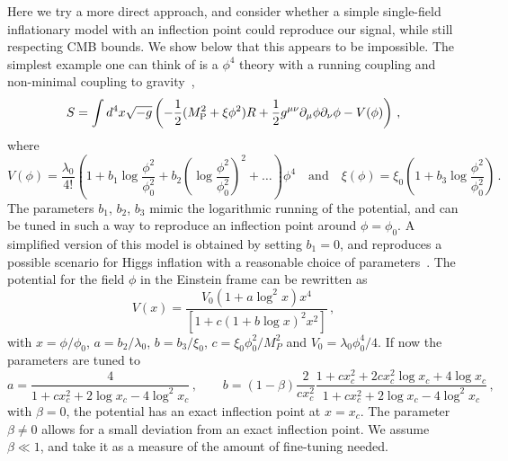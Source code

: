 \documentclass{article}
\begin{document}
Here we try a more direct approach, and consider whether a simple single-field inflationary model with an inflection point could reproduce our signal, while still respecting CMB bounds. We show below that this appears to be impossible.
The simplest example one can think of is a $\phi^4$ theory with a running coupling and non-minimal coupling to gravity~\cite{Ballesteros:2017fsr},
    \begin{equation}
        S = \int d^4 x \sqrt{-g} \left(-\frac{1}{2}(M_{\rm P}^2+\xi\phi^2)R + \frac{1}{2}g^{\mu\nu}\partial_\mu\phi \partial_\nu\phi - V(\phi) \right)\,,
    \end{equation}
    where
    \begin{equation}
        V(\phi) = \frac{\lambda_0}{4!} \left(1+b_1 \log\frac{\phi^2}{\phi_0^2}+b_2\left(\log\frac{\phi^2}{\phi_0^2}\right)^2+\ldots\right)\phi^4
        \quad
        \text{and}
        \quad
        \xi(\phi) = \xi_0 \left(1+b_3\log\frac{\phi^2}{\phi_0^2}\right) \,.
    \end{equation}
The parameters $b_1$, $b_2$, $b_3$ mimic the logarithmic running of the potential, and can be tuned in such a way to reproduce an inflection point around $\phi=\phi_0$. A simplified version of this model is obtained by setting $b_1 =0$, and reproduces a possible scenario for Higgs inflation with a reasonable choice of parameters~\cite{Garcia-Bellido:2017mdw, Drees:2019xpp}.
The potential for the field $\phi$ in the Einstein frame can be rewritten as
\begin{equation}
    V(x) = \frac{V_0 (1+a \log^2 x)x^4}{[1+c (1+b \log x)^2 x^2]}\,,
\end{equation}
with $ x= \phi/\phi_0$, $a = b_2/\lambda_0$, $b = b_3/\xi_0$, $c = \xi_0 \phi_0^2/M_P^2$ and $V_0 = \lambda_0 \phi_0^4 / 4$.
If now the parameters are tuned to
\begin{equation}
    a = \frac{4}{1 + c x_c^2 + 2 \log x_c - 4 \log^2 x_c } \,, \qquad
    b = (1-\beta ) \frac{2}{c x_c^2} \frac{1 + c x_c^2 + 2 c x_c^2 \log x_c + 4 \log x_c}{1 + c x_c^2 + 2 \log x_c - 4 \log^2 x_c }\,,
\end{equation}
with $\beta = 0$, the potential has an exact inflection point at $x = x_c$. The parameter $\beta \neq 0$ allows for a small deviation from an exact inflection point. We assume $\beta\ll 1$, and take it as a measure of the amount of fine-tuning needed.
\end{document}

